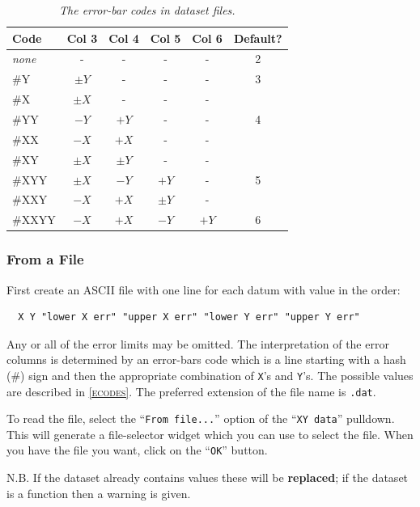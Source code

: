\documentclass[11pt,twoside,english]{article}
\begin{document}
\begin{table}[!ht]

  \caption{\label{ecodes}\textit{The error-bar codes in dataset files.}}

  \begin{center}
    \begin{tabular}{|l|cccc|c|}
      \hline 
      Code&Col 3&Col 4&Col 5&Col 6&Default?\\
      \hline
      \textit{none} & - & - & - & - & 2 \\
      \#Y&$\pm Y$&-&-&-&3\\
      \#X&$\pm X$&-&-&-&\\
      \#YY&$-Y$&$+Y$&-&-&4\\
      \#XX&$-X$&$+X$&-&-&\\
      \#XY&$\pm X$&$\pm Y$&-&-&\\
      \#XYY&$\pm X$&$-Y$&$+Y$&-&5\\
      \#XXY&$-X$&$+X$&$\pm Y$&-&\\
      \#XXYY&$-X$&$+X$&$-Y$&$+Y$&6\\
      \hline
    \end{tabular}
  \end{center}
\end{table}

\subsubsection{From a File}

First create an ASCII file with one line for each datum with value in
the order:

\begin{verbatim}
  X Y "lower X err" "upper X err" "lower Y err" "upper Y err"
\end{verbatim}
Any or all of the error limits may be omitted. The interpretation of
the error columns is determined by an error-bars code which is a line
starting with a hash (\#) sign and then the appropriate combination of
\texttt{X}'s and \texttt{Y}'s. The possible values are described in
\textsc{\autoref{ecodes}}. The preferred extension of the file name is
\texttt{.dat}.

To read the file, select the {}``\texttt{From file...}'' option of the
{}``\texttt{XY data}'' pulldown. This will generate a file-selector
widget which you can use to select the file. When you have the file you
want, click on the {}``\texttt{OK}'' button.

N.B. If the dataset already contains values these will be
\textbf{replaced}; if the dataset is a function then a warning is
given.
\end{document}
